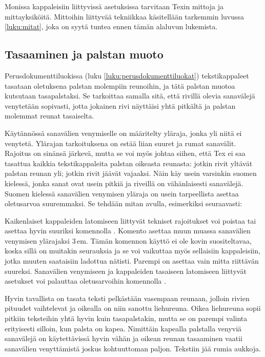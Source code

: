 Monissa kappaleisiin liittyvissä asetuksissa tarvitaan Texin mittoja ja
mittayksiköitä. Mittoihin liittyvää tekniikkaa käsitellään tarkemmin
luvussa \ref{luku:mitat}, joka on syytä tuntea ennen tämän alaluvun
lukemista.

\subsection{Tasaaminen ja palstan muoto}
\label{luku:kappaleen_tasaus}

Perusdokumenttiluokissa (luku \ref{luku:perusdokumenttiluokat})
tekstikappaleet tasataan oletuksena palstan molempiin reunoihin, ja tätä
palstan muotoa kutsutaan tasapalstaksi. Se tarkoittaa samalla sitä, että
rivillä olevia sanavälejä venytetään sopivasti, jotta jokainen rivi
näyttäisi yhtä pitkältä ja palstan molemmat reunat tasaiselta.

Käytännössä sanavälien venymiselle on määritelty yläraja, jonka yli
niitä ei venytetä. Ylärajan tarkoituksena on estää liian suuret ja rumat
sanavälit. Rajoitus on sinänsä järkevä, mutta se voi myös johtaa siihen,
että Tex ei saa tasattua kaikkia tekstikappaleita palstan oikeasta
reunasta: jotkin rivit yltävät palstan reunan yli; jotkin rivit jäävät
vajaaksi. Näin käy usein varsinkin suomen kielessä, jonka sanat ovat
usein pitkiä ja riveillä on vähänlaisesti sanavälejä. Suomen kielessä
sanavälien venymisen yläraja on usein tarpeellista asettaa oletusarvoa
suuremmaksi. Se tehdään mitan  avulla,
esimerkiksi seuraavasti:

\begin{koodilohkosis}
  \setlength{\emergencystretch}{1em}
\end{koodilohkosis}

Kaikenlaiset kappaleiden latomiseen liittyvät tekniset rajoitukset voi
poistaa tai asettaa hyvin suuriksi komennolla . Komento
asettaa muun muassa sanavälien venymisen ylärajaksi 3\,em. Tämän
komennon käyttö ei ole kovin suositeltavaa, koska sillä on muitakin
seurauksia ja se voi vaikuttaa myös sellaisiin kappaleisiin, jotka
muuten saataisiin ladottua nätisti. Parempi on asettaa vain mitta
 riittävän suureksi. Sanavälien venymiseen ja
kappaleiden tasaiseen latomiseen liittyvät asetukset voi palauttaa
oletusarvoihin komennolla .

Hyvin tavallista on tasata teksti pelkästään vasempaan reunaan, jolloin
rivien pituudet vaihtelevat ja oikealla on niin sanottu liehureuna.
Oikea liehureuna sopii pitkiin teksteihin yhtä hyvin kuin tasapalstakin,
mutta se on parempi valinta erityisesti silloin, kun palsta on kapea.
Nimittäin kapealla palstalla venyviä sanavälejä on käytettävissä hyvin
vähän ja oikean reunan tasaaminen vaatii sanavälien venyttämistä joskus
kohtuuttoman paljon. Tekstiin jää rumia aukkoja.


